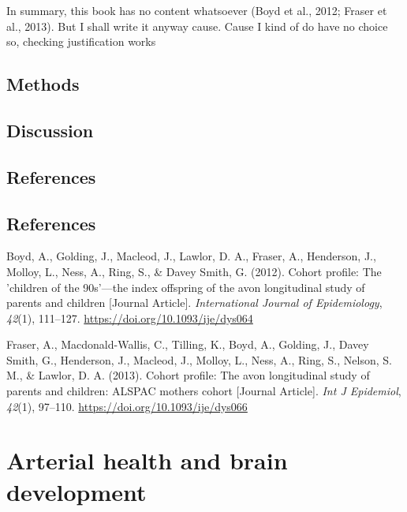 \documentclass[
  letterpaper,
  DIV=11,
  numbers=noendperiod]{scrreport}
\newlength{\cslhangindent}
\newenvironment{CSLReferences}[2] %
 {\begin{list}{}{%
  \setlength{\itemindent}{0pt}
  \setlength{\leftmargin}{0pt}
  \setlength{\parsep}{0pt}
  \ifodd #1
   \setlength{\leftmargin}{\cslhangindent}
   \setlength{\itemindent}{-1\cslhangindent}
  \fi
  \setlength{\itemsep}{#2\baselineskip}}}
 {\end{list}}
\begin{document}
In summary, this book has no content whatsoever (Boyd et al., 2012;
Fraser et al., 2013). But I shall write it anyway cause. Cause I kind of
do have no choice so, checking justification works

\section{Methods}\label{methods-4}

\section{Discussion}\label{discussion-4}

\section*{References}\label{references-5}


\section*{References}\label{bibliography--6}

\label{refs--6}
\begin{CSLReferences}{1}{0}
Boyd, A., Golding, J., Macleod, J., Lawlor, D. A., Fraser, A.,
Henderson, J., Molloy, L., Ness, A., Ring, S., \& Davey Smith, G.
(2012). Cohort profile: The 'children of the 90s'---the index offspring
of the avon longitudinal study of parents and children {[}Journal
Article{]}. \emph{International Journal of Epidemiology}, \emph{42}(1),
111--127. \url{https://doi.org/10.1093/ije/dys064}

Fraser, A., Macdonald-Wallis, C., Tilling, K., Boyd, A., Golding, J.,
Davey Smith, G., Henderson, J., Macleod, J., Molloy, L., Ness, A., Ring,
S., Nelson, S. M., \& Lawlor, D. A. (2013). Cohort profile: The avon
longitudinal study of parents and children: ALSPAC mothers cohort
{[}Journal Article{]}. \emph{Int J Epidemiol}, \emph{42}(1), 97--110.
\url{https://doi.org/10.1093/ije/dys066}

\end{CSLReferences}

\chapter{Arterial health and brain development}\label{sec-chapter7}
\end{document}
